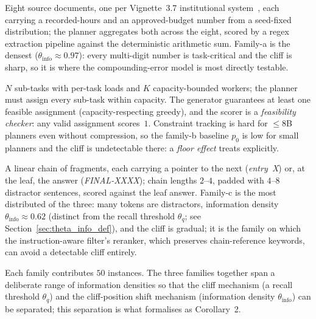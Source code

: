 \begin{description}\setlength\itemsep{2pt}

\item[Family-a: cross-document fact aggregation.] Eight source
documents, one per Vignette~3.7 institutional
system~\cite{fcgusecase2026}, each carrying a recorded-hours and an
approved-budget number from a seed-fixed distribution; the planner
aggregates both across the eight, scored by a regex extraction
pipeline against the deterministic arithmetic sum. Family-a is the
densest ($\theta_\text{info}\approx0.97$): every multi-digit number
is task-critical and the cliff is sharp, so it is where the
compounding-error model is most directly testable.

\item[Family-b: constraint-satisfaction planning.] $N$ sub-tasks
with per-task loads and $K$ capacity-bounded workers; the planner
must assign every sub-task within capacity. The generator guarantees
at least one feasible assignment (capacity-respecting greedy), and
the scorer is a \emph{feasibility checker}: any valid assignment
scores~$1$. Constraint tracking is hard for $\le8$B planners even
without compression, so the family-b baseline $p_0$ is low for small
planners and the cliff is undetectable there: a \emph{floor effect}
 treats explicitly.

\item[Family-c: multi-step retrieval.] A linear chain of fragments,
each carrying a pointer to the next (\emph{entry~X}) or, at the leaf,
the answer (\emph{FINAL-XXXX}); chain lengths $2$--$4$, padded with
$4$--$8$ distractor sentences, scored against the leaf answer.
Family-c is the most distributed of the three: many tokens are distractors,
information density $\theta_\text{info}\approx 0.62$ (distinct from the recall
threshold $\theta_q$; see Section~\ref{sec:theta_info_def}), and the
cliff is gradual; it is the family on which the instruction-aware
filter's reranker, which preserves chain-reference keywords, can
avoid a detectable cliff entirely.
\end{description}

Each family contributes $50$ instances. The three families together
span a deliberate range of information densities so that the cliff
mechanism (a recall threshold $\theta_q$) and the cliff-position
shift mechanism (information density $\theta_\text{info}$) can be
separated; this separation is what 
formalises as Corollary~2.

